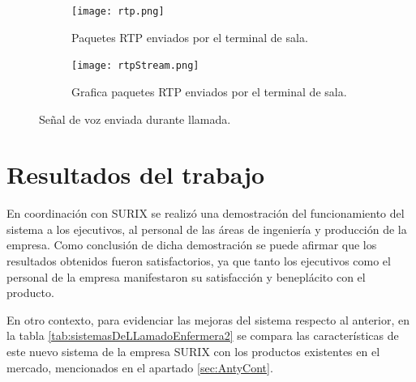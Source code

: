 \begin{figure}[htpb]
	\centering
   	\begin{subfigure}[b]{1\textwidth}
   		\centering
      	\texttt{[image: rtp.png]}
      	\caption{Paquetes RTP enviados por el terminal de sala.}
      	\label{fig:PsrtpA}
   	\end{subfigure}%
   	\newline
   	\begin{subfigure}[b]{1\textwidth}
   		\centering
      	\texttt{[image: rtpStream.png]}
      	\caption{Grafica paquetes RTP enviados por el terminal de sala.}
      	\label{fig:PsrtpB}
   	\end{subfigure}%
	\caption{Señal de voz enviada durante llamada.}
	\label{fig:Psrtp}
\end{figure}

\section{Resultados del trabajo}
\label{sec:resTrab}

En coordinación con SURIX se realizó una demostración del funcionamiento del sistema a los ejecutivos, al personal de las áreas de ingeniería y producción de la empresa. Como conclusión de dicha demostración se puede afirmar que los resultados obtenidos fueron satisfactorios, ya que tanto los ejecutivos como el personal de la empresa manifestaron su satisfacción y beneplácito con el producto.

En otro contexto, para evidenciar las mejoras del sistema respecto al anterior, en la tabla \ref{tab:sistemasDeLLamadoEnfermera2} se compara las características de este nuevo sistema de la empresa SURIX con los productos existentes en el mercado, mencionados en el apartado \ref{sec:AntyCont}. 


